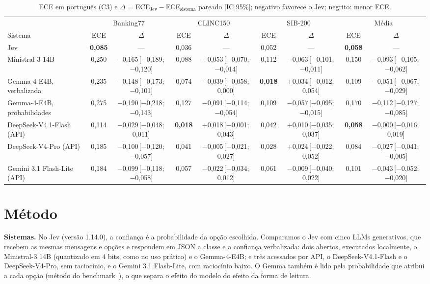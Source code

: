 \documentclass[sigconf,nonacm]{acmart}
\newcommand{\ci}[2]{\,[#1;\,#2]}
\begin{document}
\begin{table}[t]
  \caption{ECE em português (C3) e $\Delta$ = ECE$_{\text{Jev}}-$ECE$_{\text{sistema}}$ pareado [IC 95\%]; negativo favorece o Jev; negrito: menor ECE.}
  \label{tab:h1}
  \footnotesize
  \setlength{\tabcolsep}{4pt}
  \begin{tabular}{l cc cc cc cc}
    \toprule
    & \multicolumn{2}{c}{Banking77} & \multicolumn{2}{c}{CLINC150} & \multicolumn{2}{c}{SIB-200} & \multicolumn{2}{c}{Média} \\
    \cmidrule(lr){2-3}\cmidrule(lr){4-5}\cmidrule(lr){6-7}\cmidrule(lr){8-9}
    Sistema & ECE & $\Delta$ & ECE & $\Delta$ & ECE & $\Delta$ & ECE & $\Delta$ \\
    \midrule
    Jev & \textbf{0,085} & --- & 0,036 & --- & 0,052 & --- & \textbf{0,058} & --- \\
    \midrule
    Ministral-3 14B & 0,250 & $-$0,165\ci{$-$0,189}{$-$0,120} & 0,088 & $-$0,053\ci{$-$0,070}{$-$0,014} & 0,112 & $-$0,063\ci{$-$0,101}{$-$0,011} & 0,150 & $-$0,093\ci{$-$0,105}{$-$0,062} \\
    Gemma-4-E4B, verbalizada & 0,235 & $-$0,148\ci{$-$0,173}{$-$0,101} & 0,074 & $-$0,039\ci{$-$0,058}{0,000} & \textbf{0,018} & $+$0,034\ci{$-$0,012}{0,054} & 0,109 & $-$0,051\ci{$-$0,067}{$-$0,029} \\
    Gemma-4-E4B, probabilidades & 0,275 & $-$0,190\ci{$-$0,218}{$-$0,143} & 0,127 & $-$0,091\ci{$-$0,114}{$-$0,054} & 0,109 & $-$0,057\ci{$-$0,095}{$-$0,015} & 0,170 & $-$0,112\ci{$-$0,127}{$-$0,085} \\
    DeepSeek-V4.1-Flash (API) & 0,114 & $-$0,029\ci{$-$0,048}{0,011} & \textbf{0,018} & $+$0,018\ci{$-$0,001}{0,043} & 0,042 & $+$0,010\ci{$-$0,035}{0,037} & \textbf{0,058} & $-$0,000\ci{$-$0,016}{0,019} \\
    DeepSeek-V4-Pro (API) & 0,185 & $-$0,100\ci{$-$0,120}{$-$0,057} & 0,041 & $-$0,005\ci{$-$0,021}{0,027} & 0,028 & $+$0,024\ci{$-$0,022}{0,052} & 0,084 & $-$0,027\ci{$-$0,041}{$-$0,005} \\
    Gemini 3.1 Flash-Lite (API) & 0,184 & $-$0,099\ci{$-$0,118}{$-$0,058} & 0,057 & $-$0,022\ci{$-$0,034}{0,012} & 0,061 & $-$0,009\ci{$-$0,040}{0,022} & 0,101 & $-$0,043\ci{$-$0,052}{$-$0,020} \\
    \bottomrule
  \end{tabular}
\end{table}

\section{Método}
\textbf{Sistemas.} No Jev (versão 1.14.0), a confiança é a probabilidade da opção escolhida. Comparamos o Jev com cinco LLMs generativos, que recebem as mesmas mensagens e opções e respondem em JSON a classe e a confiança verbalizada: dois abertos, executados localmente, o Ministral-3 14B (quantizado em 4 bits, como no uso prático) e o Gemma-4-E4B; e três acessados por API, o DeepSeek-V4.1-Flash e o DeepSeek-V4-Pro, sem raciocínio, e o Gemini 3.1 Flash-Lite, com raciocínio baixo. O Gemma também é lido pela probabilidade que atribui a cada opção (método do benchmark~\cite{deusser2026jev}), o que separa o efeito do modelo do efeito da forma de leitura.
\end{document}
